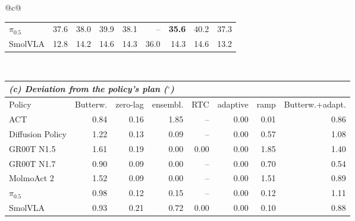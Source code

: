 \begin{tabular}{@{}c@{}}
\begin{tabular}{l rrrrrrrr}
$\pi_{0.5}$ & 37.6 & 38.0 & 39.9 & 38.1 & -- & \textbf{35.6} & 40.2 & 37.3 \\
SmolVLA & 12.8 & 14.2 & 14.6 & 14.3 & 36.0 & 14.3 & 14.6 & 13.2 \\
\bottomrule
\end{tabular}
\\[8pt]
\begin{tabular}{l rrrrrrr}
\toprule
\multicolumn{8}{l}{\textit{(c) Deviation from the policy's plan ($^\circ$)}} \\
\midrule
Policy & Butterw. & zero-lag & ensembl. & RTC & adaptive & ramp & Butterw.+adapt. \\
\midrule
ACT & 0.84 & 0.16 & 1.85 & -- & 0.00 & 0.01 & 0.86 \\
Diffusion Policy & 1.22 & 0.13 & 0.09 & -- & 0.00 & 0.57 & 1.08 \\
GR00T N1.5 & 1.61 & 0.19 & 0.00 & 0.00 & 0.00 & 1.85 & 1.40 \\
GR00T N1.7 & 0.90 & 0.09 & 0.00 & -- & 0.00 & 0.70 & 0.54 \\
MolmoAct 2 & 1.52 & 0.09 & 0.00 & -- & 0.00 & 1.51 & 0.89 \\
$\pi_{0.5}$ & 0.98 & 0.12 & 0.15 & -- & 0.00 & 0.12 & 1.11 \\
SmolVLA & 0.93 & 0.21 & 0.72 & 0.00 & 0.00 & 0.10 & 0.88 \\
\bottomrule
\end{tabular}
\end{tabular}
